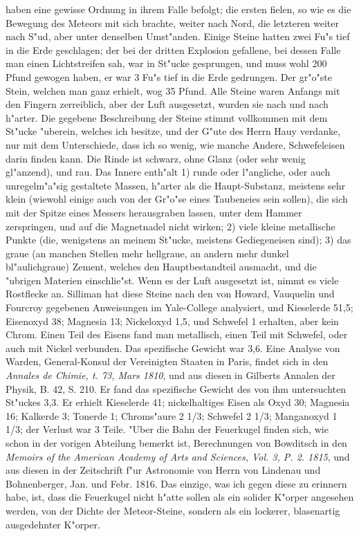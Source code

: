 \documentclass[a4paper, 11pt, oneside, polutonikogreek, german]{article}
\begin{document}
haben eine gewisse Ordnung in ihrem Falle befolgt; die ersten fielen, so wie es die Bewegung des Meteors mit sich brachte, weiter nach Nord, die letzteren weiter nach S"ud, aber unter denselben Umst"anden. Einige Steine hatten zwei Fu"s tief in die Erde geschlagen; der bei der dritten Explosion gefallene, bei dessen Falle man einen Lichtstreifen sah, war in St"ucke gesprungen, und muss wohl 200 Pfund gewogen haben, er war 3 Fu"s tief in die Erde gedrungen. Der gr"o"ste Stein, welchen man ganz erhielt, wog 35 Pfund. Alle Steine waren Anfangs mit den Fingern zerreiblich, aber der Luft ausgesetzt, wurden sie nach und nach h"arter. Die gegebene Beschreibung der Steine stimmt vollkommen mit dem St"ucke "uberein, welches ich besitze, und der G"ute des Herrn Hauy verdanke, nur mit dem Unterschiede, dass ich so wenig, wie manche Andere, Schwefeleisen darin finden kann. Die Rinde ist schwarz, ohne Glanz (oder sehr wenig gl"anzend), und rau. Das Innere enth"alt 1) runde oder l"angliche, oder auch unregelm"a"sig gestaltete Massen, h"arter als die Haupt-Substanz, meistens sehr klein (wiewohl einige auch von der Gr"o"se eines Taubeneies sein sollen), die sich mit der Spitze eines Messers herausgraben lassen, unter dem Hammer zerspringen, und auf die Magnetnadel nicht wirken; 2) viele kleine metallische Punkte (die, wenigstens an meinem St"ucke, meistens Gediegeneisen sind); 3) das graue (an manchen Stellen mehr hellgraue, an andern mehr dunkel bl"aulichgraue) Zement, welches den Hauptbestandteil ausmacht, und die "ubrigen Materien einschlie"st. Wenn es der Luft ausgesetzt ist, nimmt es viele Rostflecke an. Silliman hat diese Steine nach den von Howard, Vauquelin und Fourcroy gegebenen Anweisungen im Yale-College analysiert, und Kieselerde 51,5; Eisenoxyd 38; Magnesia 13; Nickeloxyd 1,5, und Schwefel 1 erhalten, aber kein Chrom. Einen Teil des Eisens fand man metallisch, einen Teil mit Schwefel, oder auch mit Nickel verbunden. Das spezifische Gewicht war 3,6. Eine Analyse von Warden, General-Konsul der Vereinigten Staaten in Paris, findet sich in den \emph{Annales de Chimie, t. 73, Mars 1810}, und aus diesen in Gilberts Annalen der Physik, B. 42, S. 210. Er fand das spezifische Gewicht des von ihm untersuchten St"uckes 3,3. Er erhielt Kieselerde 41; nickelhaltiges Eisen als Oxyd 30; Magnesia 16; Kalkerde 3; Tonerde 1; Chroms"aure 2 1/3; Schwefel 2 1/3; Manganoxyd 1 1/3; der Verlust war 3 Teile. "Uber die Bahn der Feuerkugel finden sich, wie schon in der vorigen Abteilung bemerkt ist, Berechnungen von Bowditsch in den \emph{Memoirs of the American Academy of Arts and Sciences, Vol. 3, P. 2. 1815}, und aus diesen in der Zeitschrift f"ur Astronomie von Herrn von Lindenau und Bohnenberger, Jan. und Febr. 1816. Das einzige, was ich gegen diese zu erinnern habe, ist, dass die Feuerkugel nicht h"atte sollen als ein solider K"orper angesehen werden, von der Dichte der Meteor-Steine, sondern als ein lockerer, blasenartig ausgedehnter K"orper.
\end{document}
